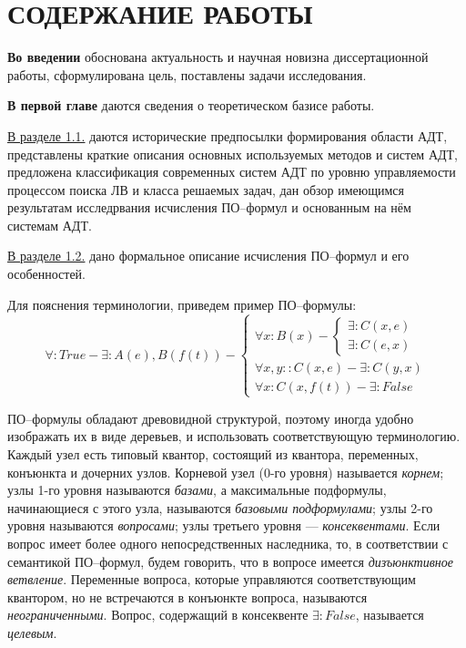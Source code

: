\documentclass[a4paper]{report}
\begin{document}
\section*{СОДЕРЖАНИЕ РАБОТЫ}


\textbf{Во введении} обоснована актуальность и научная новизна диссертационной работы, сформулирована цель, поставлены задачи исследования.


\textbf{В первой главе} даются сведения о теоретическом базисе работы.

\underline{В разделе 1.1.} даются исторические предпосылки формирования области АДТ, представлены краткие описания основных используемых методов и систем АДТ, предложена классификация современных систем АДТ по уровню управляемости процессом поиска ЛВ и класса решаемых задач, дан обзор имеющимся результатам исследрвания исчисления ПО--формул и основанным на нём системам АДТ.

\underline{В разделе 1.2.} дано формальное описание исчисления ПО--формул и его особенностей.

Для пояснения терминологии, приведем пример ПО--формулы:
$$
\forall\colon True - \exists\colon A(e),B(f(t)) - \left\{
\begin{array}{lcl}
 \forall x \colon B(x) - \left\{
     \begin{array}{lcl}
     \exists \colon C(x,e) \\
     \exists \colon C(e,x)
    \end{array}\right. \\
 \forall x,y \colon \colon C(x,e) - \exists\colon C(y,x) \\
 \forall x \colon C(x,f(t)) - \exists\colon False
\end{array}
\right.
$$

ПО--формулы обладают древовидной структурой, поэтому иногда удобно изображать их в виде деревьев, и использовать соответствующую терминологию. Каждый узел есть типовый квантор, состоящий из квантора, переменных, конъюнкта и дочерних узлов. Корневой узел (0-го уровня) называется \emph{корнем}; узлы 1-го уровня называются \emph{базами}, а максимальные подформулы, начинающиеся с этого узла, называются \emph{базовыми подформулами}; узлы 2-го уровня называются \emph{вопросами}; узлы третьего уровня --- \emph{консеквентами}. Если вопрос имеет более одного непосредственных наследника, то, в соответствии с семантикой ПО--формул, будем говорить, что в вопросе имеется \emph{дизъюнктивное ветвление}. Переменные вопроса, которые управляются соответствующим квантором, но не встречаются в конъюнкте вопроса, называются \emph{неограниченными}. Вопрос, содержащий в консеквенте $\exists\colon False$, называется \emph{целевым}.
\end{document}

